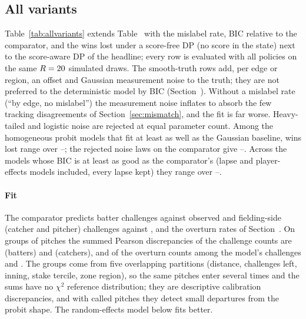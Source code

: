 \documentclass[aoas]{imsart}
\theoremstyle{plain}
\theoremstyle{definition}
\begin{document}
\subsection{All variants}
Table~\ref{tab:allvariants} extends Table~ with the mislabel rate, BIC relative to the comparator,
and the wins lost under a score-free DP (no score in the state) next to the score-aware DP of the headline; every row is
evaluated with all policies on the same $R=20$ simulated draws. The smooth-truth rows add, per edge or region,
an offset and Gaussian measurement noise to the truth; they are not preferred to the deterministic model by BIC (Section~). Without a mislabel rate (``by edge, no mislabel'') the measurement noise inflates to
absorb the few tracking disagreements of Section~\ref{sec:mismatch}, and the fit is far worse. Heavy-tailed and
logistic noise are rejected at equal parameter count. Among the homogeneous probit models that fit at least as well as
the Gaussian baseline, wins lost range over \SpreadLo--\SpreadHi; the rejected noise laws on the comparator give \SpreadRejLo--\SpreadRejHi.
Across the models whose BIC is at least as good as the comparator's (lapse and player-effects models included, every
lapse kept) they range over \SpreadAllLo--\SpreadAllHi.

\begin{table}[!htbp]
\caption{All decision-model and truth variants. $\Delta\ell$: log-likelihood relative to the Gaussian baseline; $\Delta$BIC:
relative to the comparator (negative is better); wins lost per team-season under the score-aware and the pooled
DP, at the full-season stakes, not cross-fitted, with every lapse kept ($\ell=0$) in the lapse models (full policy
cross-fit values are in Table~).}\label{tab:allvariants}
\centering\small
\resizebox{\textwidth}{!}{}
\end{table}

\paragraph{Fit} The comparator predicts \SChPredBatter{} batter challenges against \SChObsBatter{} observed and
\SChPredCatcher{} fielding-side (catcher and pitcher) challenges against \SChObsCatcher, and the overturn rates of Section~. On
\SChiBinsBatter{} groups of pitches the summed Pearson discrepancies of the challenge counts are \SChiChBatter{}
(batters) and \SChiChCatcher{} (catchers), and of the overturn counts among the model's challenges \SChiOvBatter{} and
\SChiOvCatcher. The groups come from five overlapping partitions (distance, challenges left, inning, stake tercile,
zone region), so the same pitches enter several times and the sums have no $\chi^2$ reference distribution; they are
descriptive calibration discrepancies, and with \NCalled{} called pitches they detect small departures from the probit shape. The random-effects
model below fits better.
\end{document}
